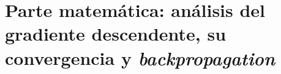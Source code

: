 ﻿\documentclass[a4paper,11pt]{article}
\begin{document}
\sloppy




\newpage



\tableofcontents
\newpage

\listoffigures
{}
\newpage

\listoftables
{}

\newpage



\hypersetup{linkcolor=red}
%

\setcounter{section}{0}
%







\newpage
{}
\setcounter{page}{1}
\vspace{4cm}

\newpage 

\part{Parte matemática: análisis del gradiente descendente, su convergencia y \textit{backpropagation}}

\pagestyle{fancy}
\fancyhead[LO]{\leftmark}
\newpage


%




\newpage


\newpage


\newpage
\end{document}

